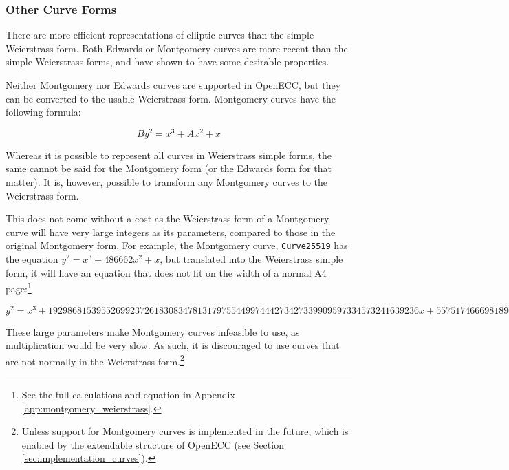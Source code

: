\subsubsection{Other Curve Forms}
\label{sec:math_curve_curves}

There are more efficient representations of elliptic curves than the simple
Weierstrass form. Both Edwards or Montgomery curves are more recent than the simple Weierstrass forms,
and have shown to have some desirable properties.\cite{safecurves}

Neither Montgomery nor Edwards curves are supported in OpenECC, but they can be converted to the
usable Weierstrass form. Montgomery curves have the following formula:

\begin{equation}
	By^2 = x^3 + Ax^2 + x
\end{equation}

Whereas it is possible to represent all curves in Weierstrass simple forms, the same cannot be said for
the Montgomery form (or the Edwards form for that matter). It is, however, possible to
transform any Montgomery curves to the Weierstrass form.\cite{safecurves}

This does not come without a cost as the Weierstrass form of a Montgomery curve will have
very large integers as its parameters, compared to those in the original Montgomery form. For example,
the Montgomery curve, \verb|Curve25519| has the equation \(y^2 = x^3+486662x^2+x\), but
translated into the Weierstrass simple form, it will have an equation that does not fit on the width of
a normal A4 page:\footnote{See the full calculations and equation in Appendix \ref{app:montgomery_weierstrass}.}

\begin{equation}
	y^2 =
	x^3 +
	19298681539552699237261830834781317975544997444273427339909597334573241639236x +
	55751746669818908907645289078257140818241103727901012315294400837956729358436
\end{equation}

These large parameters make Montgomery curves infeasible to use, as multiplication would be very slow. As such,
it is discouraged to use curves that are not normally in the Weierstrass form.\footnote{Unless support for Montgomery
curves is implemented in the future, which is enabled by the extendable structure of OpenECC (see Section
\ref{sec:implementation_curves}).}
